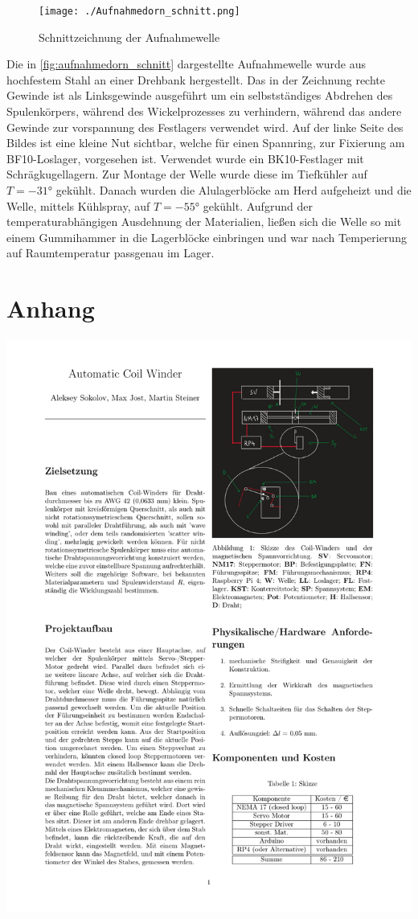 

\begin{figure}[H]
    \centering
    \texttt{[image: ./Aufnahmedorn\_schnitt.png]}
    \caption{Schnittzeichnung der Aufnahmewelle}
    \label{fig:aufnahmedorn_schnitt}
\end{figure}

Die in \autoref{fig:aufnahmedorn_schnitt} dargestellte Aufnahmewelle wurde aus hochfestem Stahl an einer Drehbank hergestellt. Das in der Zeichnung rechte Gewinde ist als Linksgewinde ausgeführt um ein selbstständiges Abdrehen des Spulenkörpers, während des Wickelprozesses zu verhindern, während das andere Gewinde zur vorspannung des Festlagers verwendet wird. Auf der linke Seite des Bildes ist eine kleine Nut sichtbar, welche für einen Spannring, zur Fixierung am BF10-Loslager, vorgesehen ist. Verwendet wurde ein BK10-Festlager mit Schrägkugellagern. Zur Montage der Welle wurde diese im Tiefkühler auf $T = -31\si{\degree}$ gekühlt. Danach wurden die Alulagerblöcke am Herd aufgeheizt und die Welle, mittels Kühlspray, auf $T = -55\si{\degree}$ gekühlt. Aufgrund der temperaturabhängigen Ausdehnung der Materialien, ließen sich die Welle so mit einem Gummihammer in die Lagerblöcke einbringen und war nach Temperierung auf Raumtemperatur passgenau im Lager.

\section{Anhang}

\includegraphics{./recources/coilwinder_sokolov_jost_steiner.pdf}